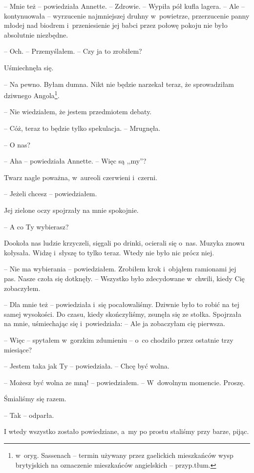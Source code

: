 \documentclass[oneside,polish,11pt,sfheadings]{mwbk}
\begin{document}
-- Mnie też -- powiedziała Annette. -- Zdrowie. -- Wypiła pół kufla lagera.
-- Ale -- kontynuowała -- wyrzucenie najmniejszej druhny w~powietrze,
przerzucenie panny młodej nad biodrem i~przeniesienie jej babci przez
połowę pokoju nie było absolutnie niezbędne.

-- Och. -- Przemyślałem. -- Czy ja to zrobiłem?

Uśmiechnęła się. 

-- Na pewno. Byłam dumna. Nikt nie będzie narzekał
teraz, że sprowadziłam dziwnego Angola\footnote{ w~oryg. Sassenach -- termin
używany przez gaelickich mieszkańców wysp brytyjskich na oznaczenie
mieszkańców angielskich  -- przyp.tłum.}.

-- Nie wiedziałem, że jestem przedmiotem debaty.

-- Cóż, teraz to będzie tylko spekulacja. -- Mrugnęła.

-- O nas?

-- Aha -- powiedziała Annette. -- Więc są ,,my''?

Twarz nagle poważna, w~aureoli czerwieni i~czerni.

-- Jeżeli chcesz -- powiedziałem.

Jej zielone oczy spojrzały na mnie spokojnie.

-- A co Ty wybierasz?

Dookoła nas ludzie krzyczeli, sięgali po drinki, ocierali się o~nas.
Muzyka znowu kołysała. Widzę i~słyszę to tylko teraz. Wtedy nie było nic
prócz niej.

-- Nie ma wybierania -- powiedziałem. Zrobiłem krok i~objąłem ramionami
jej pas. Nasze czoła się dotknęły. -- Wszystko było zdecydowane w~chwili,
kiedy Cię zobaczyłem.

-- Dla mnie też -- powiedziała i~się pocałowaliśmy. Dziwnie było to robić
na tej samej wysokości. Do czasu, kiedy skończyliśmy, zsunęła się ze
stołka. Spojrzała na mnie, uśmiechając się i~powiedziała: -- Ale ja
zobaczyłam cię pierwsza.

-- Więc -- spytałem w~gorzkim zdumieniu -- o~co chodziło przez ostatnie
trzy miesiące?

-- Jestem taka jak Ty -- powiedziała. -- Chcę być wolna.

-- Możesz być wolna ze mną! -- powiedziałem. -- W~dowolnym momencie.
Proszę.

Śmialiśmy się razem.

-- Tak -- odparła.

I wtedy wszystko zostało powiedziane, a~my po prostu staliśmy przy
barze, pijąc.
\end{document}
